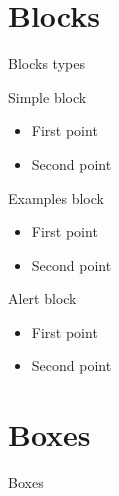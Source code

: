 \documentclass{presentation-beamer}
\begin{document}
\section{Blocks}
\begin{frame}{Blocks types}

\begin{block}{Simple block}
\begin{itemize}
  \item First point
  \item Second point
\end{itemize}
\end{block}

\begin{exampleblock}{Examples block}
\begin{itemize}
  \item First point
  \item Second point
\end{itemize}
\end{exampleblock}

\begin{alertblock}{Alert block}
\begin{itemize}
  \item First point
  \item Second point
\end{itemize}
\end{alertblock}
\end{frame}

\section{Boxes}

\begin{frame}{Boxes}










\end{frame}
\end{document}
